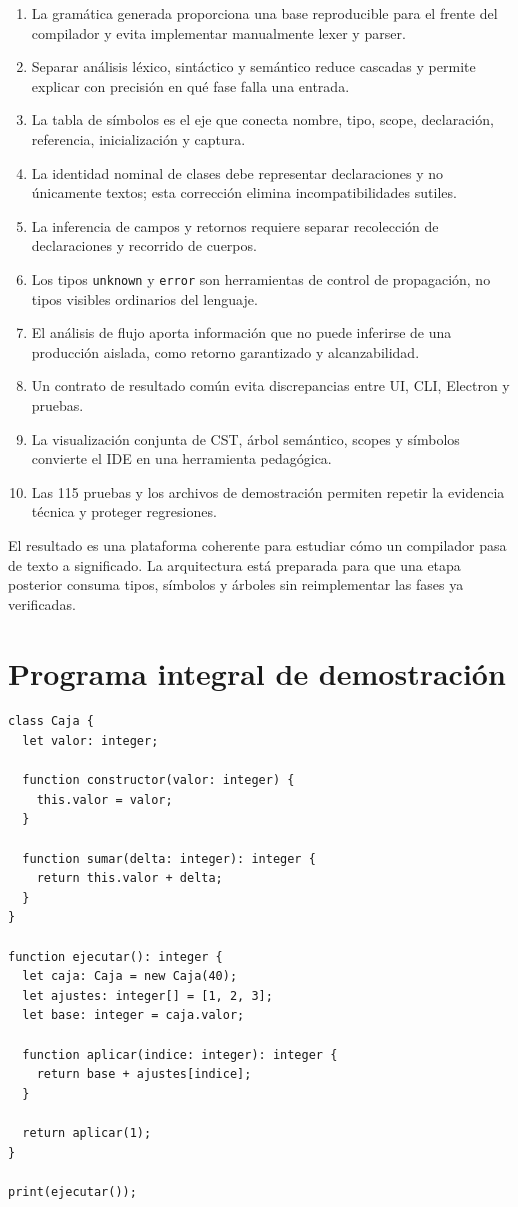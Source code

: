 \documentclass[11pt,letterpaper,oneside]{report}
\newcommand{\codigo}[1]{\texttt{#1}}
\begin{document}
\begin{enumerate}
  \item La gramática generada proporciona una base reproducible para el frente del
        compilador y evita implementar manualmente lexer y parser.
  \item Separar análisis léxico, sintáctico y semántico reduce cascadas y permite
        explicar con precisión en qué fase falla una entrada.
  \item La tabla de símbolos es el eje que conecta nombre, tipo, scope, declaración,
        referencia, inicialización y captura.
  \item La identidad nominal de clases debe representar declaraciones y no únicamente
        textos; esta corrección elimina incompatibilidades sutiles.
  \item La inferencia de campos y retornos requiere separar recolección de
        declaraciones y recorrido de cuerpos.
  \item Los tipos \codigo{unknown} y \codigo{error} son herramientas de control de
        propagación, no tipos visibles ordinarios del lenguaje.
  \item El análisis de flujo aporta información que no puede inferirse de una
        producción aislada, como retorno garantizado y alcanzabilidad.
  \item Un contrato de resultado común evita discrepancias entre UI, CLI, Electron y
        pruebas.
  \item La visualización conjunta de CST, árbol semántico, scopes y símbolos convierte
        el IDE en una herramienta pedagógica.
  \item Las 115 pruebas y los archivos de demostración permiten repetir la evidencia
        técnica y proteger regresiones.
\end{enumerate}

El resultado es una plataforma coherente para estudiar cómo un compilador pasa de
texto a significado. La arquitectura está preparada para que una etapa posterior
consuma tipos, símbolos y árboles sin reimplementar las fases ya verificadas.

\appendix

\chapter{Programa integral de demostración}

\begin{verbatim}
class Caja {
  let valor: integer;

  function constructor(valor: integer) {
    this.valor = valor;
  }

  function sumar(delta: integer): integer {
    return this.valor + delta;
  }
}

function ejecutar(): integer {
  let caja: Caja = new Caja(40);
  let ajustes: integer[] = [1, 2, 3];
  let base: integer = caja.valor;

  function aplicar(indice: integer): integer {
    return base + ajustes[indice];
  }

  return aplicar(1);
}

print(ejecutar());
\end{verbatim}
\end{document}
